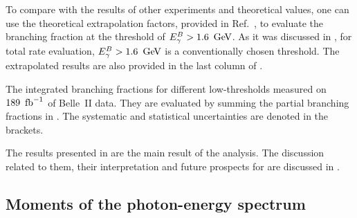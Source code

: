 To compare with the results of other experiments and theoretical values,
one can use the theoretical extrapolation factors, provided in Ref.~\cite{Buchmuller:2005zv},
to evaluate the branching fraction at the threshold of ${E^B_{\gamma}}>1.6~\mathrm{\,Ge\kern -0.1em V}$.
As it was discussed in , for \BtoXsgamma total rate evaluation, ${E^B_{\gamma}}>1.6~\mathrm{\,Ge\kern -0.1em V}$ is a conventionally chosen threshold.
The extrapolated results are also provided in the last column of .

\begin{table}[htbp!]
    \centering
    \caption{\label{tab:integrated_branching_fractions}
    The integrated \BtoXsgamma branching fractions for different low-\EB thresholds measured on $189~\mbox{\,fb}^{-1}$ of Belle~II data.
    They are evaluated by summing the partial branching fractions in .
    The systematic and statistical uncertainties are denoted in the brackets.
    }
    
\end{table}

The results presented in  are the main result of the analysis.
The discussion related to them, their interpretation and future prospects for \BtoXsgamma are discussed in .



\subsection{Moments of the \safeBtoXsgamma photon-energy spectrum}\label{sec:spectrum_moments}

